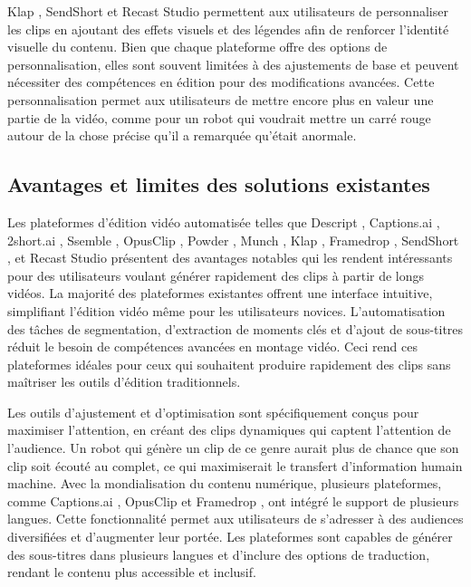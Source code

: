 Klap \cite{klap2024}, SendShort \cite{sendshort2024} et Recast Studio \cite{recast2024} permettent aux utilisateurs de personnaliser les clips en ajoutant des effets visuels et des légendes afin de renforcer l’identité visuelle du contenu. Bien que chaque plateforme offre des options de personnalisation, elles sont souvent limitées à des ajustements de base et peuvent nécessiter des compétences en édition pour des modifications avancées. Cette personnalisation permet aux utilisateurs de mettre encore plus en valeur une partie de la vidéo, comme pour un robot qui voudrait mettre un carré rouge autour de la chose précise qu’il a remarquée qu’était anormale.

\subsection{Avantages et limites des solutions existantes}
Les plateformes d’édition vidéo automatisée telles que Descript \cite{descript2024}, Captions.ai \cite{captions2024}, 2short.ai \cite{short2024}, Ssemble \cite{ssemble2024}, OpusClip \cite{opusclip2024}, Powder \cite{powder2024}, Munch \cite{munch2024}, Klap \cite{klap2024}, Framedrop \cite{framedrop2024}, SendShort \cite{sendshort2024}, et Recast Studio \cite{recast2024} présentent des avantages notables qui les rendent intéressants pour des utilisateurs voulant générer rapidement des clips à partir de longs vidéos. La majorité des plateformes existantes offrent une interface intuitive, simplifiant l’édition vidéo même pour les utilisateurs novices. L’automatisation des tâches de segmentation, d’extraction de moments clés et d’ajout de sous-titres réduit le besoin de compétences avancées en montage vidéo. Ceci rend ces plateformes idéales pour ceux qui souhaitent produire rapidement des clips sans maîtriser les outils d’édition traditionnels.

Les outils d’ajustement et d’optimisation sont spécifiquement conçus pour maximiser l’attention, en créant des clips dynamiques qui captent l’attention de l’audience. Un robot qui génère un clip de ce genre aurait plus de chance que son clip soit écouté au complet, ce qui maximiserait le transfert d’information humain machine. Avec la mondialisation du contenu numérique, plusieurs plateformes, comme Captions.ai \cite{captions2024}, OpusClip \cite{opusclip2024} et Framedrop \cite{framedrop2024}, ont intégré le support de plusieurs langues. Cette fonctionnalité permet aux utilisateurs de s’adresser à des audiences diversifiées et d’augmenter leur portée. Les plateformes sont capables de générer des sous-titres dans plusieurs langues et d’inclure des options de traduction, rendant le contenu plus accessible et inclusif.

